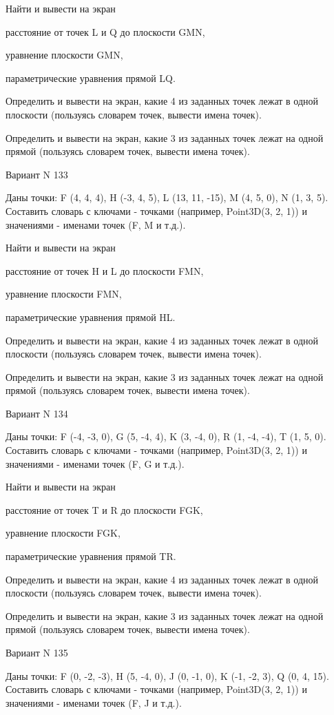 \documentclass[11pt]{report}
\begin{document}
Найти и вывести на экран


расстояние от точек L и Q до плоскости GMN,


уравнение плоскости GMN,


параметрические уравнения прямой LQ.


Определить и вывести на экран, какие 4 из заданных точек лежат в одной плоскости (пользуясь словарем точек, вывести имена точек).


Определить и вывести на экран, какие 3 из заданных точек лежат на одной прямой (пользуясь словарем точек, вывести имена точек).

\newpage
Вариант N 133

Даны точки: F (4, 4, 4), H (-3, 4, 5), L (13, 11, -15), M (4, 5, 0), N (1, 3, 5).
Составить словарь с ключами - точками (например, Point3D(3, 2, 1)) и значениями - именами точек (F, M и т.д.).


Найти и вывести на экран


расстояние от точек H и L до плоскости FMN,


уравнение плоскости FMN,


параметрические уравнения прямой HL.


Определить и вывести на экран, какие 4 из заданных точек лежат в одной плоскости (пользуясь словарем точек, вывести имена точек).


Определить и вывести на экран, какие 3 из заданных точек лежат на одной прямой (пользуясь словарем точек, вывести имена точек).

\newpage
Вариант N 134

Даны точки: F (-4, -3, 0), G (5, -4, 4), K (3, -4, 0), R (1, -4, -4), T (1, 5, 0).
Составить словарь с ключами - точками (например, Point3D(3, 2, 1)) и значениями - именами точек (F, G и т.д.).


Найти и вывести на экран


расстояние от точек T и R до плоскости FGK,


уравнение плоскости FGK,


параметрические уравнения прямой TR.


Определить и вывести на экран, какие 4 из заданных точек лежат в одной плоскости (пользуясь словарем точек, вывести имена точек).


Определить и вывести на экран, какие 3 из заданных точек лежат на одной прямой (пользуясь словарем точек, вывести имена точек).

\newpage
Вариант N 135

Даны точки: F (0, -2, -3), H (5, -4, 0), J (0, -1, 0), K (-1, -2, 3), Q (0, 4, 15).
Составить словарь с ключами - точками (например, Point3D(3, 2, 1)) и значениями - именами точек (F, J и т.д.).
\end{document}
